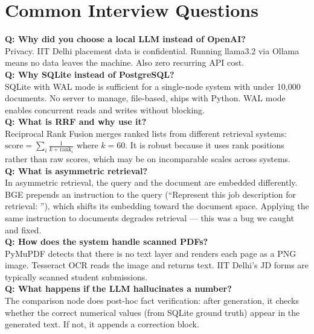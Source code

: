 \documentclass[12pt, a4paper]{article}
\begin{document}
\section{Common Interview Questions}

\begin{interviewbox}

\textbf{Q: Why did you choose a local LLM instead of OpenAI?}\\
Privacy. IIT Delhi placement data is confidential. Running llama3.2 via Ollama means no data leaves the machine. Also zero recurring API cost.\\[6pt]

\textbf{Q: Why SQLite instead of PostgreSQL?}\\
SQLite with WAL mode is sufficient for a single-node system with under 10,000 documents. No server to manage, file-based, ships with Python. WAL mode enables concurrent reads and writes without blocking.\\[6pt]

\textbf{Q: What is RRF and why use it?}\\
Reciprocal Rank Fusion merges ranked lists from different retrieval systems: $\text{score} = \sum_i \frac{1}{k + \text{rank}_i}$ where $k=60$. It is robust because it uses rank positions rather than raw scores, which may be on incomparable scales across systems.\\[6pt]

\textbf{Q: What is asymmetric retrieval?}\\
In asymmetric retrieval, the query and the document are embedded differently. BGE prepends an instruction to the query (``Represent this job description for retrieval: ''), which shifts its embedding toward the document space. Applying the same instruction to documents degrades retrieval --- this was a bug we caught and fixed.\\[6pt]

\textbf{Q: How does the system handle scanned PDFs?}\\
PyMuPDF detects that there is no text layer and renders each page as a PNG image. Tesseract OCR reads the image and returns text. IIT Delhi's JD forms are typically scanned student submissions.\\[6pt]

\textbf{Q: What happens if the LLM hallucinates a number?}\\
The comparison node does post-hoc fact verification: after generation, it checks whether the correct numerical values (from SQLite ground truth) appear in the generated text. If not, it appends a correction block.\\[6pt]


\end{interviewbox}
\end{document}
